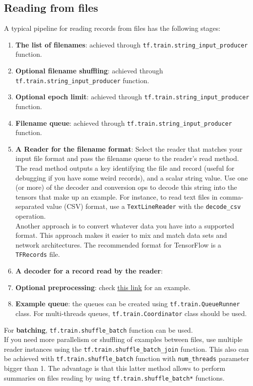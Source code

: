 \documentclass[11pt,a4paper]{article}
\begin{document}
\subsection{Reading from files}
A typical pipeline for reading records from files has the following stages:
\begin{enumerate}
	\item \textbf{The list of filenames}: achieved through \texttt{tf.train.string\_input\_producer} function. 
	\item \textbf{Optional filename shuffling}: achieved through \texttt{tf.train.string\_input\_producer} function.
	\item \textbf{Optional epoch limit}: achieved through \texttt{tf.train.string\_input\_producer} function.
	\item \textbf{Filename queue}: achieved through \texttt{tf.train.string\_input\_producer} function.
	\item \textbf{A Reader for the filename format}: Select the reader that matches your input file format and pass the filename queue to the reader's read method. The read method outputs a key identifying the file and record (useful for debugging if you have some weird records), and a scalar string value. Use one (or more) of the decoder and conversion ops to decode this string into the tensors that make up an example. For instance, to read text files in comma-separated value (CSV) format, use a \texttt{TextLineReader} with the \texttt{decode\_csv} operation. \\ 
	Another approach is to convert whatever data you have into a supported format. This approach makes it easier to mix and match data sets and network architectures. The recommended format for TensorFlow is a \texttt{TFRecords} file. 
	\item \textbf{A decoder for a record read by the reader}: 
	\item \textbf{Optional preprocessing}: check \href{https://www.tensorflow.org/code/tensorflow/models/image/cifar10/cifar10_input.py}{this link} for an example. 
	\item \textbf{Example queue}: the queues can be created using \texttt{tf.train.QueueRunner} class. For multi-threads queues, \texttt{tf.train.Coordinator} class should be used. 
\end{enumerate}
For \textbf{batching}, \texttt{tf.train.shuffle\_batch} function can be used. \\
If you need more parallelism or shuffling of examples between files, use multiple reader instances using the \texttt{tf.train.shuffle\_batch\_join} function. This also can be achieved with \texttt{tf.train.shuffle\_batch} function with \texttt{num\_threads} parameter bigger than 1. The advantage is that this latter method allows to perform summaries on files reading by using \texttt{tf.train.shuffle\_batch*} functions. 
\end{document}

